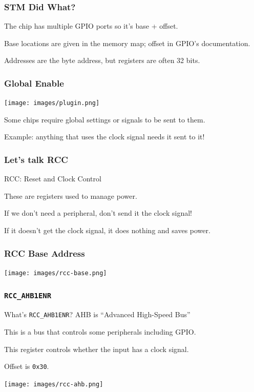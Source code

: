 \begin{frame}
\frametitle{STM Did What?}

The chip has multiple GPIO ports so it's base + offset.

Base locations are given in the memory map; offset in GPIO's documentation.

Addresses are the byte address, but registers are often 32 bits.

\end{frame}




\begin{frame}
\frametitle{Global Enable}


\begin{center}
	\texttt{[image: images/plugin.png]}
\end{center}

Some chips require global settings or signals to be sent to them.

Example: anything that uses the clock signal needs it sent to it!

\end{frame}


\begin{frame}
\frametitle{Let's talk RCC}

\alert{RCC}: Reset and Clock Control

These are registers used to manage power.

If we don't need a peripheral, don't send it the clock signal!

If it doesn't get the clock signal, it does nothing and saves power.


\end{frame}


\begin{frame}
\frametitle{RCC Base Address}

\begin{center}
	\texttt{[image: images/rcc-base.png]}
\end{center}


\end{frame}


\begin{frame}
\frametitle{\texttt{RCC\_AHB1ENR}}

What's \texttt{RCC\_AHB1ENR}? AHB is ``Advanced High-Speed Bus''

This is a bus that controls some peripherals including GPIO.

This register controls whether the input has a clock signal. 

Offset is \texttt{0x30}.

\begin{center}
	\texttt{[image: images/rcc-ahb.png]}
\end{center}

\end{frame}



